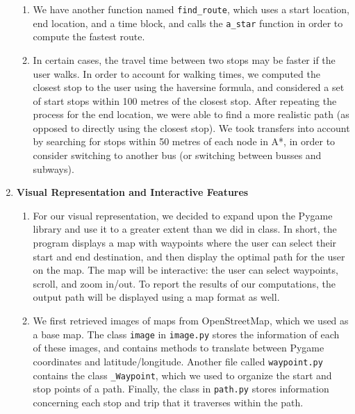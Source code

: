 \documentclass[fontsize=11pt]{article}
\begin{document}
\begin{enumerate}
\begin{enumerate}
            \item We have another function named \texttt{find\_route}, which uses a start location, end location, and a time block, and calls the \texttt{a\_star} function in order to compute the fastest route. \\

            \item In certain cases, the travel time between two stops may be faster if the user walks. In order to account for walking times, we computed the closest stop to the user using the haversine formula, and considered a set of start stops within 100 metres of the closest stop. After repeating the process for the end location, we were able to find a more realistic path (as opposed to directly using the closest stop). We took transfers into account by searching for stops within 50 metres of each node in A*, in order to consider switching to another bus (or switching between busses and subways). \\

        \end{enumerate}

        \item \textbf{Visual Representation and Interactive Features}
        \begin{enumerate}
            \item For our visual representation, we decided to expand upon the Pygame library and use it to a greater extent than we did in class. In short, the program displays a map with waypoints where the user can select their start and end destination, and then display the optimal path for the user on the map. The map will be interactive: the user can select waypoints, scroll, and zoom in/out. To report the results of our computations, the output path will be displayed using a map format as well. \\

            \item We first retrieved images of maps from OpenStreetMap, which we used as a base map. The class \texttt{image} in \texttt{image.py} stores the information of each of these images, and contains methods to translate between Pygame coordinates and latitude/longitude. Another file called \texttt{waypoint.py} contains the class \texttt{\_Waypoint}, which we used to organize the start and stop points of a path. Finally, the class  in \texttt{path.py} stores information concerning each stop and trip that it traverses within the path. \\


\end{enumerate}
\end{enumerate}
\end{document}

